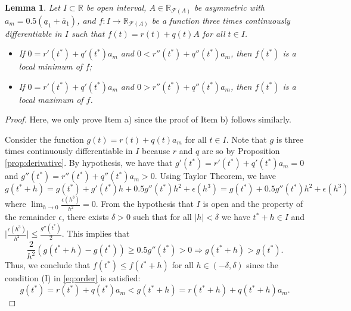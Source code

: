 \documentclass[12pt,a4paper]{article}
\newcommand{\RR}{\mathbb{R}}
\newcommand{\RFA}{\mathbb{R}_{\mathcal{F}(A)}}
\newtheorem{lemma}{Lemma}
\begin{document}
\begin{lemma}\label{lem:second_condition}
Let $I\subset \RR$ be open interval, $A\in \RFA$ be asymmetric with $a_m = 0.5(\underline{a}_1 + \overline{a}_1)$, and $f:I \to \RFA$ be a function three times continuously differentiable in $I$ such that 
$f(t) = r(t) + q(t)A$ for all $t \in I$. 
\begin{itemize}
    \item[a)] If $0=r'(t^*) + q'(t^*)a_m$ and $0 < r''(t^*) + q''(t^*)a_m$, then $f(t^*)$ is a local minimum of $f$;
    \item[b)] If $0=r'(t^*) + q'(t^*)a_m$ and $0 > r''(t^*) + q''(t^*)a_m$, then $f(t^*)$ is a local maximum of $f$. 
\end{itemize}
\end{lemma}
\begin{proof}
Here, we only prove Item a) since the proof of Item b) follows similarly. 

Consider the function $g(t) = r(t) + q(t)a_m$ for all $t \in I$. Note that $g$ is three times continuously  differentiable in $I$ because $r$ and $q$ are so by Proposition \ref{prop:derivative}. 
By hypothesis, we have that $g'(t^*) = r'(t^*) + q'(t^*)a_m = 0$ and 
$g''(t^*) = r''(t^*) + q''(t^*)a_m > 0.$
Using Taylor Theorem, we have 
$$
g(t^*+h) = g(t^*) + g'(t^*)h + 0.5g''(t^*)h^2 + \epsilon(h^3) =  g(t^*) + 0.5g''(t^*)h^2 + \epsilon(h^3)
$$
where $\lim_{h\to 0} \frac{\epsilon(h^3)}{h^2} = 0$. 
From the hypothesis that $I$ is open and the property of the remainder $\epsilon$,   
there exists $\delta > 0$ such that for all $|h| < \delta$ we have $t^*+h \in I$ and $\Big|\frac{\epsilon(h^3)}{h^2}\Big| \leq \frac{g''(t^*)}{2}.$
This implies that 
$$
\frac{2}{h^2}(g(t^*+h) - g(t^*)) \geq   0.5g''(t^*) > 0 \Rightarrow g(t^*+h) > g(t^*).
$$
Thus, we conclude that $f(t^*) \leq f(t^*+h)$ for all $h \in (-\delta,\delta)$ since the condition (I) in \eqref{eq:order} is satisfied:
$$
g(t^*) = r(t^*) + q(t^*)a_m < g(t^*+h) = r(t^*+h) + q(t^*+h)a_m.
$$
\end{proof}


\end{document}
